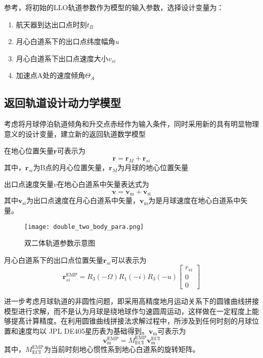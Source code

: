 {\color{red}参考，}将初始的LLO轨道参数作为模型的输入参数，选择设计变量为：
\begin{enumerate}[label=\arabic*)]
	\item 航天器到达出口点时刻$t_B$
	\item 月心白道系下的出口点纬度幅角$u$
	\item 月心白道系下出口点速度大小$v_{si}$
	\item 加速点A处的速度倾角$\Theta_A$
\end{enumerate}

\subsection{返回轨道设计动力学模型}
考虑将月球停泊轨道倾角和升交点赤经作为输入条件，同时采用新的具有明显物理意义的设计变量，建立新的返回轨道数学模型

在地心位置矢量$\bm{r}$可表示为
\begin{equation}
	\bm{r}=\bm{r}_M+\bm{r}_{si}
\end{equation}
其中，$\bm{r}_{si}$为B点的月心位置矢量，$\bm{r}_M$为月球的地心位置矢量

出口点速度矢量$v$在地心白道系中矢量表达式为
\begin{equation}
	\bm{v}=\bm{v}_\mathrm{m}+\bm{v}_\mathrm{si}
\end{equation}
其中$ \bm{v}_\mathrm{si} $为出口点速度在月心白道系中矢量，$ \bm{v}_\mathrm{m} $为是月球速度在地心白道系中矢量。

\begin{figure}[htb]
	\centering
	\texttt{[image: double\_two\_body\_para.png]}
	\caption{双二体轨道参数示意图}
	\label{fig:double_two_body_para}
\end{figure}

月心白道系下的出口点位置矢量$\bm{r}_{si}$可以表示为
\begin{equation}
	\bm{r}_{si}^{\mathrm{EMP}}=R_3(-\Omega)R_1(-i)R_3(-u)\left[\begin{array}{c}
			r_{si} \\0\\0
		\end{array}\right]
\end{equation}



进一步考虑月球轨道的非圆性问题，即采用高精度地月运动关系下的圆锥曲线拼接模型进行求解，而不是认为月球是绕地球作匀速圆周运动，这样做在一定程度上能够提髙计算精度。在利用圆锥曲线拼接法求解过程中，所涉及到任何时刻的月球位置和速度均以 JPL DE405星历表为基础得到。$ \bm{v}_\mathrm{m} $可表示为
\begin{equation}
	\bm{v}_\mathrm{m}^{\mathrm{EMP}}=M_{\mathrm{ECI}}^{\mathrm{EMP}}\bm{v}_\mathrm{m}^{\mathrm{ECI}}
\end{equation}
其中，$ M_{\mathrm{ECI}}^{\mathrm{EMP}} $为当前时刻地心惯性系到地心白道系的旋转矩阵。

